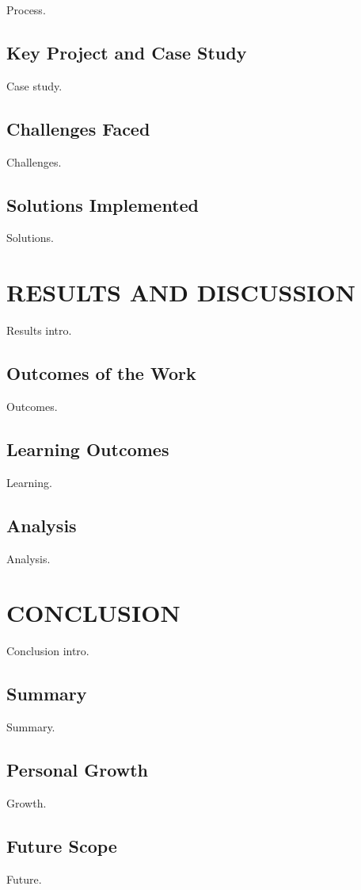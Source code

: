\documentclass[12pt,a4paper]{report}
\begin{document}
Process.


\section{Key Project and Case Study}

Case study.




\section{Challenges Faced}

Challenges.


\section{Solutions Implemented}

Solutions.


\chapter{RESULTS AND DISCUSSION}


Results intro.




\section{Outcomes of the Work}

Outcomes.


\section{Learning Outcomes}

Learning.


\section{Analysis}

Analysis.




\chapter{CONCLUSION}


Conclusion intro.




\section{Summary}

Summary.


\section{Personal Growth}

Growth.


\section{Future Scope}

Future.
\end{document}
